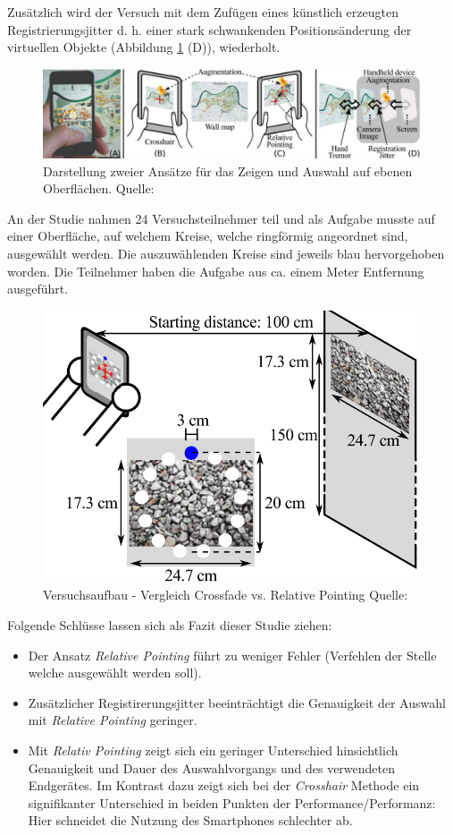 Zusätzlich wird der Versuch mit dem Zufügen eines künstlich erzeugten Registrierungsjitter d. h. einer stark schwankenden Positionsänderung der virtuellen Objekte (Abbildung \ref{img:pointing_vergleich} (D)), wiederholt. 

\begin{figure}[H]
	\centering
	\includegraphics[width=.7\textwidth]{resources/analyse/Pointing_techniken.png}
	\caption{Darstellung zweier Ansätze für das Zeigen und Auswahl auf ebenen Oberflächen. Quelle: \cite{Vincent2013}}
	\label{img:pointing_vergleich}
\end{figure}

An der Studie nahmen 24 Versuchsteilnehmer teil und als Aufgabe musste auf einer Oberfläche, auf welchem Kreise, welche ringförmig angeordnet sind, ausgewählt werden. Die auszuwählenden Kreise sind jeweils blau hervorgehoben worden. Die Teilnehmer haben die Aufgabe aus ca. einem Meter Entfernung ausgeführt.

\begin{figure}[H]
	\centering
	\includegraphics[width=.5\textwidth]{resources/analyse/versuchsaufbau.png}
	\caption{Versuchsaufbau - Vergleich Crossfade vs. Relative Pointing Quelle: \cite{Vincent2013}}
	\label{img:versuchsaufbau}
\end{figure}

Folgende Schlüsse lassen sich als Fazit dieser Studie ziehen:

\begin{itemize}
\item{Der Ansatz \textit{Relative Pointing} führt zu weniger Fehler (Verfehlen der Stelle welche ausgewählt werden soll).}
\item{Zusätzlicher Registirerungsjitter beeinträchtigt die Genauigkeit der Auswahl mit \textit{Relative Pointing} geringer.}
\item{Mit \textit{Relativ Pointing} zeigt sich ein geringer Unterschied hinsichtlich Genauigkeit und Dauer des Auswahlvorgangs und des verwendeten Endgerätes. Im Kontrast dazu zeigt sich bei der \textit{Crosshair} Methode ein signifikanter Unterschied in beiden Punkten der Performance/Performanz: Hier schneidet die Nutzung des Smartphones schlechter ab.}
\end{itemize}

